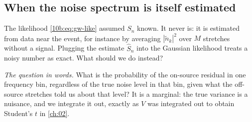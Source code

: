\subsection{When the noise spectrum is itself estimated}
\label{10b:sec:psd}

The likelihood \eqref{10b:eq:gw-like} assumed $S_n$ known. It never is: it is estimated from data near the event,
for instance by averaging $|\tilde n_k|^2$ over $M$ stretches without a signal. Plugging the estimate $\hat S_n$
into the Gaussian likelihood treats a noisy number as exact. What should we do instead?

\emph{The question in words.} What is the probability of the on-source residual in one frequency bin, regardless of
the true noise level in that bin, given what the off-source stretches told us about that level? It is a marginal:
the true variance is a nuisance, and we integrate it out, exactly as $V$ was integrated out to obtain Student's $t$
in \cref{ch:02}.

